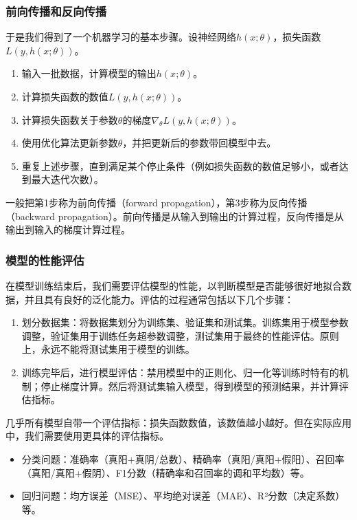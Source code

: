 \documentclass[aspectratio=1610]{ctexbeamer}
\begin{document}
\begin{frame}
    \frametitle{前向传播和反向传播}

    于是我们得到了一个机器学习的基本步骤。设神经网络$h(x; \theta)$，损失函数$L(y, h(x; \theta))$。
    \begin{enumerate}
        \item 输入一批数据，计算模型的输出$h(x; \theta)$。
        \item 计算损失函数的数值$L(y, h(x; \theta))$。
        \item 计算损失函数关于参数$\theta$的梯度$\nabla_\theta L(y, h(x; \theta))$。
        \item 使用优化算法更新参数$\theta$，并把更新后的参数带回模型中去。
        \item 重复上述步骤，直到满足某个停止条件（例如损失函数的数值足够小，或者达到最大迭代次数）。
    \end{enumerate}

    一般把第1步称为前向传播（forward propagation），第3步称为反向传播（backward propagation）。前向传播是从输入到输出的计算过程，反向传播是从输出到输入的梯度计算过程。

\end{frame}

\begin{frame}
    \frametitle{模型的性能评估}
    
    在模型训练结束后，我们需要评估模型的性能，以判断模型是否能够很好地拟合数据，并且具有良好的泛化能力。评估的过程通常包括以下几个步骤：
    \begin{enumerate}
        \item 划分数据集：将数据集划分为训练集、验证集和测试集。训练集用于模型参数调整，验证集用于训练任务超参数调整，测试集用于最终的性能评估。原则上，永远不能将测试集用于模型的训练。
        \item 训练完毕后，进行模型评估：禁用模型中的正则化、归一化等训练时特有的机制；停止梯度计算。然后将测试集输入模型，得到模型的预测结果，并计算评估指标。
    \end{enumerate}

    几乎所有模型自带一个评估指标：损失函数数值，该数值越小越好。但在实际应用中，我们需要使用更具体的评估指标。
    \begin{itemize}
        \item 分类问题：准确率（真阳+真阴/总数）、精确率（真阳/真阳+假阳）、召回率（真阳/真阳+假阴）、F1分数（精确率和召回率的调和平均数）等。
        \item 回归问题：均方误差（MSE）、平均绝对误差（MAE）、R²分数（决定系数）等。
    \end{itemize}

\end{frame}
\end{document}
